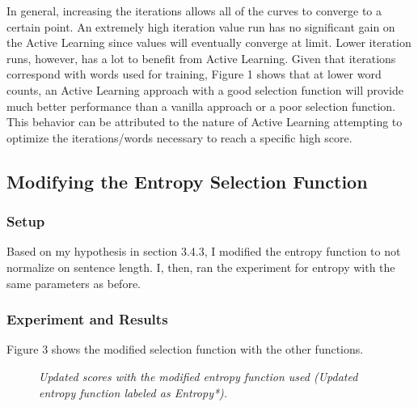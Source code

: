 \documentclass{article} %
\begin{document}
In general, increasing the iterations allows all of the curves to converge to a certain point. An extremely high iteration value run has no significant gain on the Active Learning since values will eventually converge at limit. Lower iteration runs, however, has a lot to benefit from Active Learning. Given that iterations correspond with words used for training, Figure 1 shows that at lower word counts, an Active Learning approach with a good selection function will provide much better performance than a vanilla approach or a poor selection function. This behavior can be attributed to the nature of Active Learning attempting to optimize the iterations/words necessary to reach a specific high score.


\subsection{Modifying the Entropy Selection Function}

\subsubsection{Setup}

Based on my hypothesis in section 3.4.3, I modified the entropy function to not normalize on sentence length. I, then, ran the experiment for entropy with the same parameters as before.

\subsubsection{Experiment and Results}

Figure 3 shows the modified selection function with the other functions.

\begin{figure}[h]%
	\centering
    \caption{\textit{Updated scores with the modified entropy function used (Updated entropy function labeled as Entropy*).}}
    \label{fig:default}
\end{figure}
\end{document}
